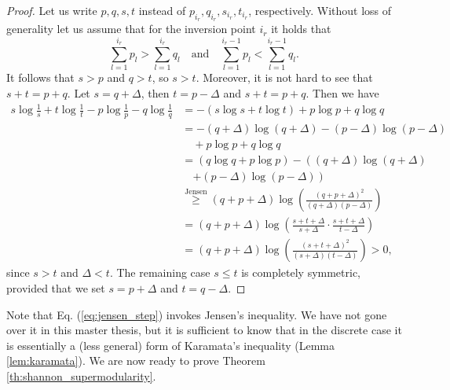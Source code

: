 \begin{proof}
    Let us write $p, q, s, t$ instead of $p_{i_r}, q_{i_r}, s_{i_r}, t_{i_r}$, respectively. Without loss of generality let us assume that for the inversion point $i_r$ it holds that
    \begin{equation}
        \sum_{l=1}^{i_r} p_l > \sum_{l=1}^{i_r} q_l \quad \text{and} \quad \sum_{l=1}^{i_r-1} p_l < \sum_{l=1}^{i_r-1} q_l.
    \end{equation}
    It follows that $s > p$ and $q > t$, so $s > t$. Moreover, it is not hard to see that $s + t = p + q$. Let $s = q + \Delta$, then $t = p - \Delta$ and $s + t = p + q$. Then we have
    \begin{align}
        s \log \frac{1}{s} + t \log \frac{1}{t} - p \log \frac{1}{p} - q \log \frac{1}{q}
        &= - (s \log s + t \log t) + p \log p + q \log q \\
        &= - (q + \Delta) \log (q + \Delta) - (p - \Delta) \log (p - \Delta)\nonumber\\
        &\quad + p \log p + q \log q \\
        &= (q \log q + p \log p) - \left( (q + \Delta) \log (q + \Delta) \right.\nonumber\\
        &\quad \left. + (p - \Delta) \log (p - \Delta) \right) \\
        &\overset{\text{Jensen}}{\geq} (q + p + \Delta) \log \left( \frac{(q + p + \Delta)^2}{(q + \Delta)(p - \Delta)} \right) \label{eq:jensen_step} \\
        &= (q + p + \Delta) \log \left( \frac{s + t + \Delta}{s + \Delta} \cdot \frac{s + t + \Delta}{t - \Delta} \right) \\
        &= (q + p + \Delta) \log \left( \frac{(s + t + \Delta)^2}{(s + \Delta)(t - \Delta)} \right) > 0,
    \end{align}
    since $s > t$ and $\Delta < t$. The remaining case $s \leq t$ is completely symmetric, provided that we set $s = p + \Delta$ and $t = q - \Delta$. \qedhere
\end{proof}

Note that Eq. (\ref{eq:jensen_step}) invokes Jensen's inequality. We have not gone over it in this master thesis, but it is sufficient to know that in the discrete case it is essentially a (less general) form of Karamata's inequality (Lemma \ref{lem:karamata}). We are now ready to prove Theorem \ref{th:shannon_supermodularity}.

